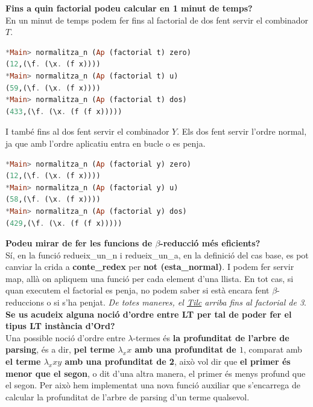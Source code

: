 \documentclass[10pt,a4paper]{article}
\begin{document}
\textbf{Fins a quin factorial podeu calcular en 1 minut de temps?} \\

En un minut de temps podem fer fins al factorial de dos fent servir el combinador $T$.

\begin{lstlisting}[language=Haskell]
*Main> normalitza_n (Ap (factorial t) zero)
(12,(\f. (\x. (f x))))
*Main> normalitza_n (Ap (factorial t) u)
(59,(\f. (\x. (f x))))
*Main> normalitza_n (Ap (factorial t) dos)
(433,(\f. (\x. (f (f x)))))
\end{lstlisting}

I també fins al dos fent servir el combinador $Y$. Els dos fent servir l'ordre normal, ja que amb l'ordre aplicatiu entra en bucle o es penja.

\begin{lstlisting}[language=Haskell]
*Main> normalitza_n (Ap (factorial y) zero)
(12,(\f. (\x. (f x))))
*Main> normalitza_n (Ap (factorial y) u)
(58,(\f. (\x. (f x))))
*Main> normalitza_n (Ap (factorial y) dos)
(429,(\f. (\x. (f (f x)))))
\end{lstlisting}

\textbf{Podeu mirar de fer les funcions de $\beta$-reducció més eficients?} \\

Sí, en la funció redueix\_un\_n i redueix\_un\_a, en la definició del cas base, es pot canviar la crida a \textbf{conte\_redex} per \textbf{not (esta\_normal)}. I podem fer servir map, allà on apliquem una funció per cada element d'una llista. En tot cas, si quan executem el factorial es penja, no podem saber si està encara fent $\beta$-reduccions o si s'ha penjat. \textit{De totes maneres, el \href{https://imae.udg.edu/~villaret/tilc/TILC-Presentation.html}{Tilc} arriba fins al factorial de 3}. \\

\textbf{Se us acudeix alguna noció d’ordre entre LT per tal de poder fer el tipus LT instància d’Ord?} \\

Una possible noció d'ordre entre $\lambda$-termes és \textbf{la profunditat de l'arbre de parsing}, és a dir, \textbf{pel terme $\lambda_x x$ amb una profunditat de $1$}, comparat amb \textbf{el terme $\lambda_x x y$ amb una profunditat de 2}, això vol dir que \textbf{el primer és menor que el segon}, o dit d'una altra manera, el primer és menys profund que el segon. Per això hem implementat una nova funció auxiliar que s'encarrega de calcular la profunditat de l'arbre de parsing d'un terme qualsevol.
\end{document}
